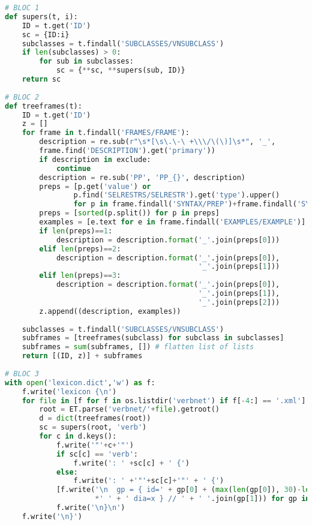 \begin{lstlisting}[language=Python, caption = Script pour générer 'lexicon.dict']
# BLOC 1
def supers(t, i):
    ID = t.get('ID')
    sc = {ID:i}
    subclasses = t.findall('SUBCLASSES/VNSUBCLASS')
    if len(subclasses) > 0:
        for sub in subclasses:
            sc = {**sc, **supers(sub, ID)}
    return sc
		
# BLOC 2
def treeframes(t):
    ID = t.get('ID')
    z = []
    for frame in t.findall('FRAMES/FRAME'):
        description = re.sub(r"\s*[\s\.\-\ +\\\/\(\)]\s*", '_', 
        frame.find('DESCRIPTION').get('primary'))
        if description in exclude:
            continue
        description = re.sub('PP', 'PP_{}', description)
        preps = [p.get('value') or 
                p.find('SELRESTRS/SELRESTR').get('type').upper() 
                for p in frame.findall('SYNTAX/PREP')+frame.findall('SYNTAX/LEX')]
        preps = [sorted(p.split()) for p in preps]     
        examples = [e.text for e in frame.findall('EXAMPLES/EXAMPLE')]
        if len(preps)==1:
            description = description.format('_'.join(preps[0]))
        elif len(preps)==2:
            description = description.format('_'.join(preps[0]),
                                             '_'.join(preps[1]))
        elif len(preps)==3:
            description = description.format('_'.join(preps[0]), 
                                             '_'.join(preps[1]), 
                                             '_'.join(preps[2]))
        z.append((description, examples))
        
    subclasses = t.findall('SUBCLASSES/VNSUBCLASS')
    subframes = [treeframes(subclass) for subclass in subclasses]
    subframes = sum(subframes, []) # flatten list of lists
    return [(ID, z)] + subframes
		
# BLOC 3
with open('lexicon.dict','w') as f:
    f.write('lexicon {\n')
    for file in [f for f in os.listdir('verbnet') if f[-4:] == '.xml']:
        root = ET.parse('verbnet/'+file).getroot()       
        d = dict(treeframes(root))
        sc = supers(root, 'verb')
        for c in d.keys():
            f.write('"'+c+'"')
            if sc[c] == 'verb':
                f.write(': ' +sc[c] + ' {')
            else:
                f.write(': ' +'"'+sc[c]+'"' + ' {')
            [f.write('\n  gp = { id=' + gp[0] + (max(len(gp[0]), 30)-len(gp[0]))
                     *' ' + ' dia=x } // ' + ' '.join(gp[1])) for gp in d[c]]
            f.write('\n}\n')
    f.write('\n}')
\end{lstlisting}

